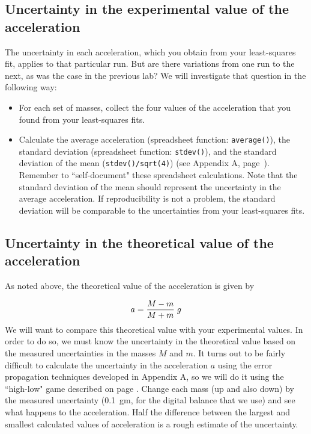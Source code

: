 \subsection*{Uncertainty in the experimental value of the acceleration}
The uncertainty in each acceleration, which you obtain from your
least-squares fit, applies to that particular run.  But are there
variations from one run to the next, as was the case in the previous lab? We will investigate that
question in the following way:
\begin{itemize}
\item For each set of masses, collect the four values of the
acceleration that you found from your least-squares fits.
%
\item Calculate the average acceleration (spreadsheet function: {\tt average()}), the standard deviation
(spreadsheet function: {\tt stdev()}), and
the standard deviation of the mean ({\tt stdev()/sqrt(4)}) \label{atwood.sdev.mean} (see Appendix A, page~\pageref{sdev.mean}).
Remember to ``self-document" these spreadsheet calculations.
Note that the standard
deviation of the mean should represent the uncertainty in the
average acceleration.
If reproducibility is not a problem,
the standard deviation will be
comparable to the uncertainties from your least-squares fits.  %
\end{itemize}

\subsection*{Uncertainty in the theoretical value of
the acceleration}

As noted above, the theoretical value of the acceleration is given by

\begin{equation}
 a = {{M - m} \over {M + m}}\; g \label{eq:atwood.a}
\end{equation}
We will want to compare this theoretical value with your experimental
values.  In order to do so, we must know the uncertainty in the
theoretical value based on the measured uncertainties in the masses
$M$ and $m$.  It turns out to be fairly difficult to calculate the
uncertainty in the acceleration $a$ using the error propagation techniques developed in
Appendix A,
so we will do it using the ``high-low" game described on page \pageref{par:high.low.game}. %
Change each mass (up and also down) by the measured
uncertainty (0.1~gm, for the digital balance that we use) and see what
happens to the acceleration.  Half the difference between the largest
and smallest calculated values of acceleration is a rough estimate of
the uncertainty.

